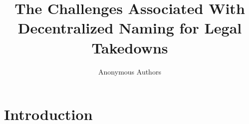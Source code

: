 \documentclass[conference]{IEEEtran}
\begin{document}
\author{Anonymous Authors}

\title{The Challenges Associated With Decentralized Naming for Legal Takedowns}





\maketitle
\pagestyle{plain}

\section{Introduction}
\end{document}
